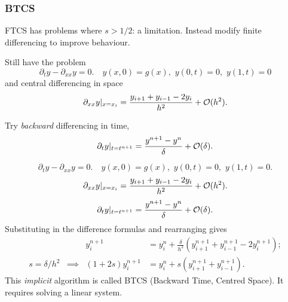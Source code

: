 \documentclass{beamer}
\begin{document}
\begin{frame}
  \frametitle{BTCS}

  \begin{overlayarea}{\textwidth}{0.8\textheight}
    {
      FTCS has problems where $s
      > 1/2$:  a limitation. Instead modify
      finite differencing to improve  behaviour.
    }
    {

      \vspace{1ex}

      Still have the problem
      \begin{equation*}
        \partial_{t} y - \partial_{x x} y = 0. \quad y(x, 0) = g(x),
        \,\, y(0, t) = 0, \,\, y(1, t) = 0
      \end{equation*}
      and central differencing in space
      \begin{equation*}
        \partial_{x x} y |_{x = x_i} = \frac{ y_{i+1} + y_{i-1} - 2
          y_i}{h^2} + {\cal O}(h^2).
      \end{equation*}
    }
    {

      Try \emph{backward} differencing in time,
      \begin{equation*}
        \partial_t y |_{t = t^{n+1}} = \frac{y^{n+1} - y^n}{\delta} + {\cal
          O}(\delta).
      \end{equation*}
    }
    {
      \begin{equation*}
        \partial_{t} y - \partial_{x x} y = 0. \quad y(x, 0) = g(x),
        \,\, y(0, t) = 0, \,\, y(1, t) = 0.
      \end{equation*}
      \begin{equation*}
        \partial_{x x} y |_{x = x_i} = \frac{ y_{i+1} + y_{i-1} - 2
          y_i}{h^2} + {\cal O}(h^2).
      \end{equation*}
      \begin{equation*}
        \partial_t y |_{t = t^{n+1}} = \frac{y^{n+1} - y^n}{\delta} + {\cal
          O}(\delta).
      \end{equation*}
      Substituting in the difference formulas and rearranging gives
      \begin{align*}
        && y_i^{n+1} & = y_i^n + \frac{\delta}{h^2} \left( y_{i+1}^{n+1} +
          y_{i-1}^{n+1} - 2 y_i^{n+1} \right); \\
        s = \delta / h^2 & \implies & (1 + 2 s) y_i^{n+1} & = y_i^n +
        s \left( y_{i+1}^{n+1} + y_{i-1}^{n+1} \right).
      \end{align*}
    }
    {
      This \emph{implicit} algorithm is called BTCS (Backward Time,
      Centred Space). It requires solving a linear system.
    }
  \end{overlayarea}


\end{frame}
\end{document}
